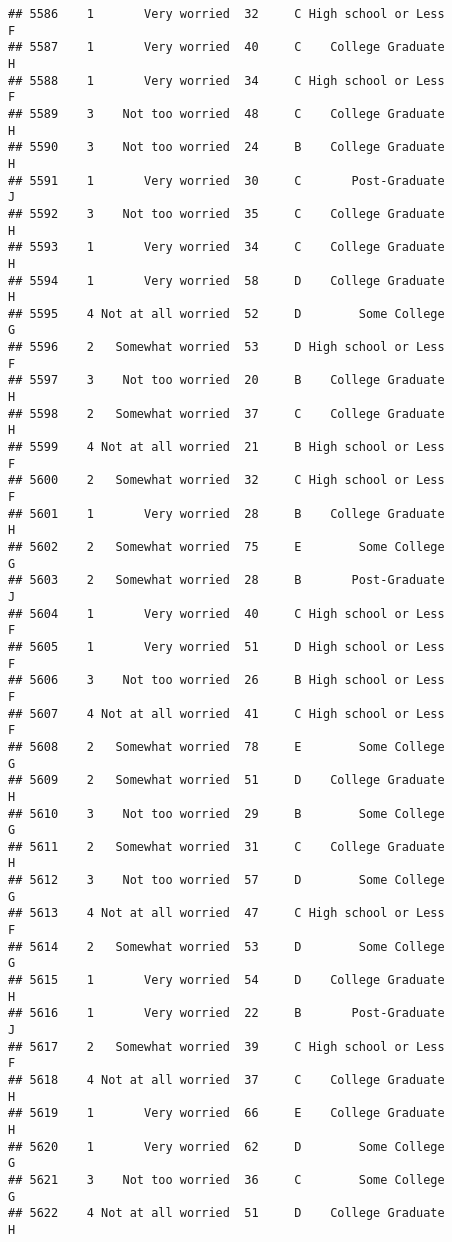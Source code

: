\documentclass[
]{article}
\begin{document}
\begin{verbatim}
## 5586    1       Very worried  32     C High school or Less         F
## 5587    1       Very worried  40     C    College Graduate         H
## 5588    1       Very worried  34     C High school or Less         F
## 5589    3    Not too worried  48     C    College Graduate         H
## 5590    3    Not too worried  24     B    College Graduate         H
## 5591    1       Very worried  30     C       Post-Graduate         J
## 5592    3    Not too worried  35     C    College Graduate         H
## 5593    1       Very worried  34     C    College Graduate         H
## 5594    1       Very worried  58     D    College Graduate         H
## 5595    4 Not at all worried  52     D        Some College         G
## 5596    2   Somewhat worried  53     D High school or Less         F
## 5597    3    Not too worried  20     B    College Graduate         H
## 5598    2   Somewhat worried  37     C    College Graduate         H
## 5599    4 Not at all worried  21     B High school or Less         F
## 5600    2   Somewhat worried  32     C High school or Less         F
## 5601    1       Very worried  28     B    College Graduate         H
## 5602    2   Somewhat worried  75     E        Some College         G
## 5603    2   Somewhat worried  28     B       Post-Graduate         J
## 5604    1       Very worried  40     C High school or Less         F
## 5605    1       Very worried  51     D High school or Less         F
## 5606    3    Not too worried  26     B High school or Less         F
## 5607    4 Not at all worried  41     C High school or Less         F
## 5608    2   Somewhat worried  78     E        Some College         G
## 5609    2   Somewhat worried  51     D    College Graduate         H
## 5610    3    Not too worried  29     B        Some College         G
## 5611    2   Somewhat worried  31     C    College Graduate         H
## 5612    3    Not too worried  57     D        Some College         G
## 5613    4 Not at all worried  47     C High school or Less         F
## 5614    2   Somewhat worried  53     D        Some College         G
## 5615    1       Very worried  54     D    College Graduate         H
## 5616    1       Very worried  22     B       Post-Graduate         J
## 5617    2   Somewhat worried  39     C High school or Less         F
## 5618    4 Not at all worried  37     C    College Graduate         H
## 5619    1       Very worried  66     E    College Graduate         H
## 5620    1       Very worried  62     D        Some College         G
## 5621    3    Not too worried  36     C        Some College         G
## 5622    4 Not at all worried  51     D    College Graduate         H

\end{verbatim}
\end{document}

